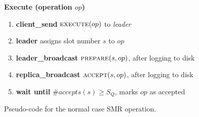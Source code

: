 \begin{figure}[t]
  \begin{small}
    \textbf{Execute (operation $op$)}

    \begin{enumerate}[itemsep=0pt,parsep=0pt]

        \item \textbf{client\_send} $\textsc{execute}(op)$ to \emph{leader}

        \item \textbf{leader} assigns slot number $s$ to $op$

        \item \textbf{leader\_broadcast} $\textsc{prepare}(s, op)$, after logging to disk

        \item \textbf{replica\_broadcast} $\textsc{accept}(s, op)$, after logging to disk

        \item \textbf{wait until} $\#accepts(s) \geq S_Q$, marks $op$ as accepted
    \end{enumerate}

  \end{small}
  \caption{Pseudo-code for the normal case SMR operation.}\label{fig:smr-update}
\end{figure}

